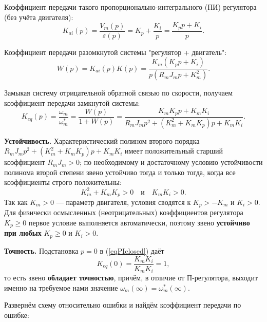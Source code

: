 \documentclass[12pt,a4paper]{extarticle}
\begin{document}
	Коэффициент передачи такого пропорционально-интегрального (ПИ) регулятора (без учёта двигателя):
	\begin{equation}
		K_{ai}(p)=\dfrac{V_m(p)}{\varepsilon(p)}=K_p+\dfrac{K_i}{p}=\dfrac{K_pp+K_i}{p}.
	\end{equation}
	
	Коэффициент передачи разомкнутой системы "регулятор + двигатель":
	\begin{equation}
		W(p)=K_{ai}(p)K(p)=\dfrac{K_m(K_pp+K_i)}{p(R_mJ_mp+K_m^2)}.
	\end{equation}
	
	Замыкая систему отрицательной обратной связью по скорости, получаем коэффициент передачи замкнутой системы:
	\begin{equation}
		K_{eq}(p)=\dfrac{\omega_m}{\omega^*_m}=\dfrac{W(p)}{1+W(p)}=\boxed{ \dfrac{K_mK_pp+K_mK_i}{R_mJ_mp^2+(K_m^2+K_mK_p)p+K_mK_i}}.
		\label{eqPIclosed}
	\end{equation}
	
	\textbf{Устойчивость.} Характеристический полином второго порядка $R_mJ_mp^2+(K_m^2+K_mK_p)p+K_mK_i$ имеет положительный старший коэффициент $R_mJ_m>0$; по необходимому и достаточному условию устойчивости полинома второй степени звено устойчиво тогда и только тогда, когда все коэффициенты строго положительны:
	\begin{equation*}
		K_m^2+K_mK_p>0 \quad\text{и}\quad K_mK_i>0.
	\end{equation*}
	Так как $K_m>0$ — параметр двигателя, условия сводятся к $K_p>-K_m$ и $K_i>0$. Для физически осмысленных (неотрицательных) коэффициентов регулятора $K_p\geq0$ первое условие выполняется автоматически, поэтому звено \textbf{устойчиво при любых} $K_p\geq0$ и $K_i>0$.
	
	\textbf{Точность.} Подстановка $p=0$ в (\ref{eqPIclosed}) даёт
	\begin{equation*}
		K_{eq}(0)=\dfrac{K_mK_i}{K_mK_i}=1,
	\end{equation*}
	то есть звено \textbf{обладает точностью}, причём, в отличие от П-регулятора, выходит именно на требуемое нами значение $\omega_m(\infty)=\omega_m^*(\infty)$.
	
	Развернём схему относительно ошибки и найдём коэффициент передачи по ошибке:
\end{document}
